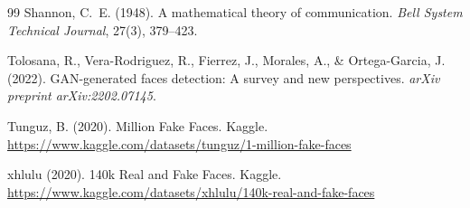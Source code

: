 \documentclass[11pt,a4paper]{article}
\begin{document}
\begin{thebibliography}{99}
Shannon, C.~E. (1948).
\newblock A mathematical theory of communication.
\newblock \textit{Bell System Technical Journal}, 27(3), 379--423.

Tolosana, R., Vera-Rodriguez, R., Fierrez, J., Morales, A., \&
  Ortega-Garcia, J. (2022).
\newblock GAN-generated faces detection: A survey and new perspectives.
\newblock \textit{arXiv preprint arXiv:2202.07145}.

Tunguz, B. (2020).
 Million Fake Faces.
\newblock Kaggle. \url{https://www.kaggle.com/datasets/tunguz/1-million-fake-faces}

xhlulu (2020).
\newblock 140k Real and Fake Faces.
\newblock Kaggle. \url{https://www.kaggle.com/datasets/xhlulu/140k-real-and-fake-faces}

\end{thebibliography}
\end{document}
